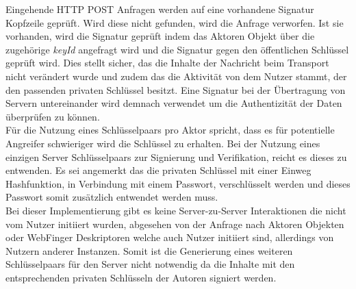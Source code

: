 Eingehende HTTP POST Anfragen werden auf eine vorhandene Signatur Kopfzeile geprüft. Wird diese nicht gefunden, wird die Anfrage verworfen. Ist sie vorhanden, wird die Signatur geprüft indem das Aktoren Objekt über die zugehörige \textit{keyId} angefragt wird und die Signatur gegen den öffentlichen Schlüssel geprüft wird. Dies stellt sicher, das die Inhalte der Nachricht beim Transport nicht verändert wurde und zudem das die Aktivität von dem Nutzer stammt, der den passenden privaten Schlüssel besitzt. Eine Signatur bei der Übertragung von Servern untereinander wird demnach verwendet um die Authentizität der Daten überprüfen zu können.\\

Für die Nutzung eines Schlüsselpaars pro Aktor spricht, dass es für potentielle Angreifer schwieriger wird die Schlüssel zu erhalten. Bei der Nutzung eines einzigen Server Schlüsselpaars zur Signierung und Verifikation, reicht es dieses zu entwenden. Es sei angemerkt das die privaten Schlüssel mit einer Einweg Hashfunktion, in Verbindung mit einem Passwort, verschlüsselt werden und dieses Passwort somit zusätzlich entwendet werden muss.\\

Bei dieser Implementierung gibt es keine Server-zu-Server Interaktionen die nicht vom Nutzer initiiert wurden, abgesehen von der Anfrage nach Aktoren Objekten oder WebFinger Deskriptoren welche auch Nutzer initiiert sind, allerdings von Nutzern anderer Instanzen. Somit ist die Generierung eines weiteren Schlüsselpaars für den Server nicht notwendig da die Inhalte mit den entsprechenden privaten Schlüsseln der Autoren signiert werden.